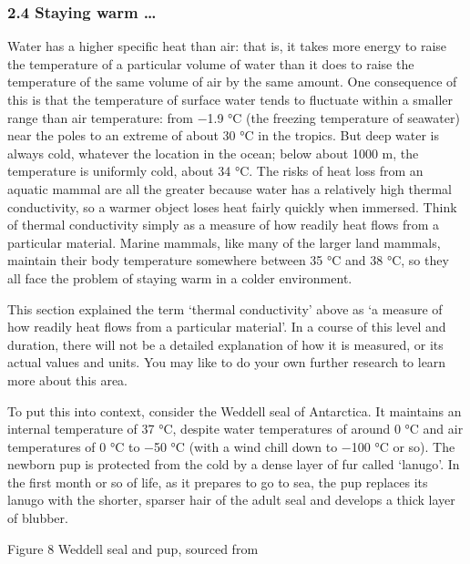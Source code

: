 \documentclass[letterpaper,10pt,english]{sphinxmanual}
\let\sphinxpxdimen\pdfpxdimen\else\newdimen\sphinxpxdimen
\begin{document}
\subsubsection{2.4 Staying warm …}
\label{\detokenize{content/session_00/Part_00_02:2.4-Staying-warm-_u2026}}
Water has a higher specific heat than air: that is, it takes more energy to raise the temperature of a particular volume of water than it does to raise the temperature of the same volume of air by the same amount. One consequence of this is that the temperature of surface water tends to fluctuate within a smaller range than air temperature: from −1.9 °C (the freezing temperature of seawater) near the poles to an extreme of about 30 °C in the tropics. But deep water is always cold, whatever the
location in the ocean; below about 1000 m, the temperature is uniformly cold, about 3\sphinxhyphen{}4 °C. The risks of heat loss from an aquatic mammal are all the greater because water has a relatively high thermal conductivity, so a warmer object loses heat fairly quickly when immersed. Think of thermal conductivity simply as a measure of how readily heat flows from a particular material. Marine mammals, like many of the larger land mammals, maintain their body temperature somewhere between 35 °C and 38 °C,
so they all face the problem of staying warm in a colder environment.



This section explained the term ‘thermal conductivity’ above as ‘a measure of how readily heat flows from a particular material’. In a course of this level and duration, there will not be a detailed explanation of how it is measured, or its actual values and units. You may like to do your own further research to learn more about this area.



To put this into context, consider the Weddell seal of Antarctica. It maintains an internal temperature of 37 °C, despite water temperatures of around 0 °C and air temperatures of 0 °C to −50 °C (with a wind chill down to −100 °C or so). The newborn pup is protected from the cold by a dense layer of fur called ‘lanugo’. In the first month or so of life, as it prepares to go to sea, the pup replaces its lanugo with the shorter, sparser hair of the adult seal and develops a thick layer of blubber.

\sphinxincludegraphics[width=512\sphinxpxdimen,height=471\sphinxpxdimen]{{s182_11_figure_9_weddell_mother_and_pup}.jpg}

Figure 8 Weddell seal and pup, sourced from 
\end{document}
